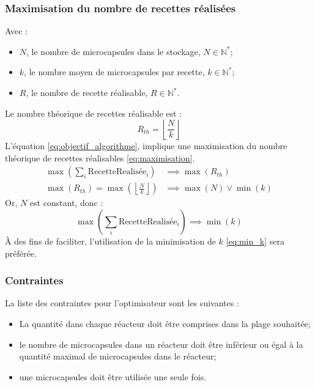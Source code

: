 \subsubsection{Maximisation du nombre de recettes réalisées}
Avec :
\begin{itemize}
    \item $N$, le nombre de microcapsules dans le stockage, $N \in \mathbb{N}^*$;
    \item $k$, le nombre moyen de microcapsules par recette, $k\in \mathbb{N}^*$;
    \item $R$, le nombre de recette réalisable, $R\in \mathbb{N}^*$.
\end{itemize}
Le nombre théorique de recettes réalisable est :
\begin{equation}
   R_{th} = \left\lfloor \frac{N}{k}\right\rfloor
   \label{eq:nbre_recipe_th}
\end{equation}
L'équation \eqref{eq:objectif_algorithme}, implique une maximisation du nombre théorique de recettes réalisables \eqref{eq:maximisation}.
\begin{align}
    \max \left(\sum_{i}\text{RecetteRealisée}_i\right) &\implies \max\left(R_{th}\right) 
    \label{eq:maximisation} \\
    \max(R_{th}) = \max\left( \left\lfloor \frac{N}{k}\right\rfloor\right) &\implies \max\left(N\right) \vee \min\left(k\right)
\end{align}
Or, \(N\) est constant, donc :
\begin{equation}
    \max\left( \sum_{i} \text{RecetteRealisée}_i \right) \implies \min\left(k\right)
    \label{eq:min_k}
\end{equation}
À des fins de faciliter, l'utilisation de la minimisation de $k$ \eqref{eq:min_k} sera préférée.
\subsubsection{Contraintes}
La liste des contraintes pour l'optimisateur sont les suivantes :
\begin{itemize}
    \item La quantité dans chaque réacteur doit être comprises dans la plage souhaitée;
    \item le nombre de microcapsules dans un réacteur doit être inférieur ou égal à la quantité maximal de microcapsules dans le réacteur;
    \item une microcapsules doit être utilisée une seule fois.
\end{itemize}
